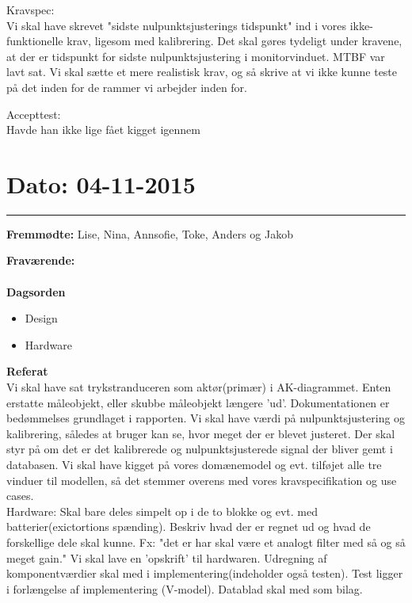 Kravspec:
\\
Vi skal have skrevet "sidste nulpunktsjusterings tidspunkt" ind i vores ikke-funktionelle krav, ligesom med kalibrering. Det skal gøres tydeligt under kravene, at der er tidspunkt for sidste nulpunktsjustering i monitorvinduet.
MTBF var lavt sat. Vi skal sætte et mere realistisk krav, og så skrive at vi ikke kunne teste på det inden for de rammer vi arbejder inden for.

Accepttest:
\\
Havde han ikke lige fået kigget igennem


\section{Dato: 04-11-2015}
\hrule

\textbf{Fremmødte:} Lise, Nina, Annsofie, Toke, Anders og Jakob

\textbf{Fraværende:} 
\\
\\
\textbf{Dagsorden}
\begin{itemize}
	\item Design
	\item Hardware
\end{itemize}

\textbf{Referat}
\\
Vi skal have sat trykstranduceren som aktør(primær) i AK-diagrammet. Enten erstatte måleobjekt, eller skubbe måleobjekt længere 'ud'.
Dokumentationen er bedømmelses grundlaget i rapporten.
Vi skal have værdi på nulpunktsjustering og kalibrering, således at bruger kan se, hvor meget der er blevet justeret.
Der skal styr på om det er det kalibrerede og nulpunktsjusterede signal der bliver gemt i databasen.
Vi skal have kigget på vores domænemodel og evt. tilføjet alle tre vinduer til modellen, så det stemmer overens med vores kravspecifikation og use cases.
\\
Hardware:
Skal bare deles simpelt op i de to blokke og evt. med batterier(exictortions spænding).
Beskriv hvad der er regnet ud og hvad de forskellige dele skal kunne. 
Fx: "det er har skal være et analogt filter med så og så meget gain."
Vi skal lave en 'opskrift' til hardwaren.
Udregning af komponentværdier skal med i implementering(indeholder også testen).
Test ligger i forlængelse af implementering (V-model).
Datablad skal med som bilag.

